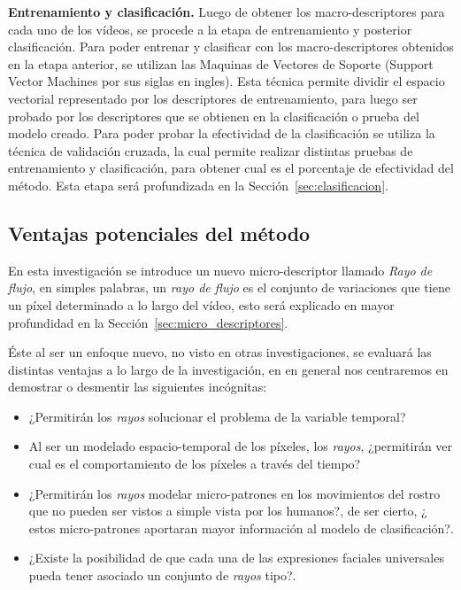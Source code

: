 \textbf{Entrenamiento y clasificación.}
Luego de obtener los macro-des\-crip\-tores para cada uno de los vídeos, se procede a la etapa de entrenamiento y posterior clasificación. Para poder entrenar y clasificar con los macro-descriptores obtenidos en la etapa anterior, se utilizan las Maquinas de Vectores de Soporte (Support Vector Machines por sus siglas en ingles). Esta técnica permite dividir el espacio vectorial representado por los descriptores de entrenamiento, para luego ser probado por los descriptores que se obtienen en la clasificación o prueba del modelo creado. Para poder probar la efectividad de la clasificación se utiliza la técnica de validación cruzada, la cual permite realizar distintas pruebas de entrenamiento y clasificación, para obtener cual es el porcentaje de efectividad del método. Esta etapa será profundizada en la Sección~\ref{sec:clasificacion}.

\subsection{Ventajas potenciales del método}
En esta investigación se introduce un nuevo micro-descriptor llamado \textit{Rayo de flujo}, en simples palabras, 
un \textit{rayo de flujo} es el conjunto de variaciones que tiene un píxel determinado a lo largo del vídeo, esto será explicado en mayor profundidad en la Sección~\ref{sec:micro_descriptores}.

Éste al ser un enfoque nuevo, no visto en otras investigaciones, se evaluará las distintas ventajas a lo largo de la investigación, en en general nos centraremos en demostrar o desmentir las siguientes incógnitas:

\begin{itemize}
	\item ¿Permitirán los \textit{rayos} solucionar el problema de la variable temporal?
	\item Al ser un modelado espacio-temporal de los píxeles, los \textit{rayos}, ¿permitirán ver cual es el comportamiento de los píxeles a través del tiempo?
	\item ¿Permitirán los \textit{rayos} modelar micro-patrones en los movimientos del rostro que no pueden ser vistos a simple vista por los humanos?, de ser cierto, ¿ estos micro-patrones aportaran mayor información al modelo de clasificación?.
	\item ¿Existe la posibilidad de que cada una de las expresiones faciales universales pueda tener asociado un conjunto de \textit{rayos} tipo?. 
\end{itemize}


